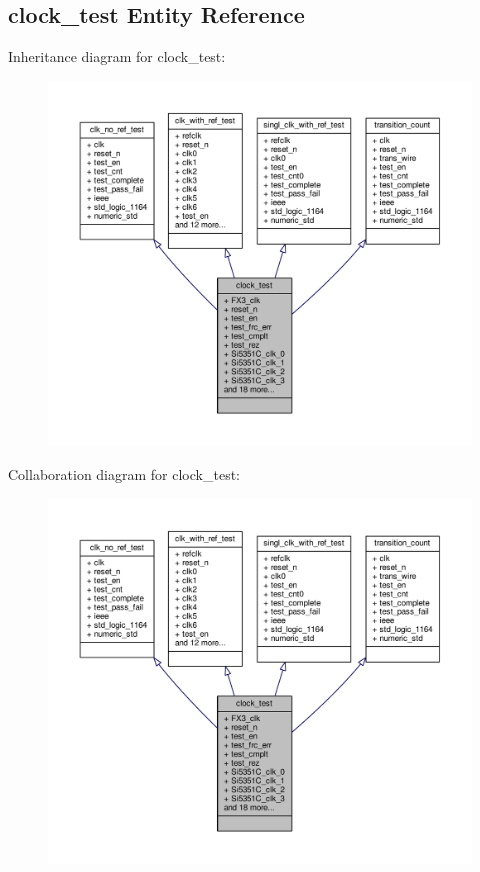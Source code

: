 \subsection{clock\+\_\+test Entity Reference}
\label{classclock__test}


Inheritance diagram for clock\+\_\+test\+:\nopagebreak
\begin{figure}[H]
\begin{center}
\leavevmode
\includegraphics[width=350pt]{da/d14/classclock__test__inherit__graph}
\end{center}
\end{figure}


Collaboration diagram for clock\+\_\+test\+:\nopagebreak
\begin{figure}[H]
\begin{center}
\leavevmode
\includegraphics[width=350pt]{d8/d94/classclock__test__coll__graph}
\end{center}
\end{figure}
